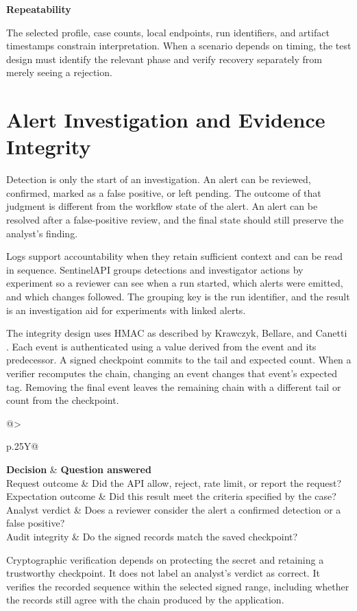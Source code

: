 \documentclass[11pt,a4paper,oneside]{report}
\makeatletter
\newcommand{\topic}[1]{\smallskip\noindent\textbf{#1}\par\nobreak\vspace{-.39em}}
\newcommand{\sheet}[1]{\clearpage\section{#1}}
\newcommand{\tabletitle}[1]{\captionof{table}{#1}\smallskip}
\newcommand{\bodytable}[1]{\begin{tabularx}{\linewidth}{@{}>{\raggedright\arraybackslash}p{.25\linewidth}Y@{}}\toprule #1\bottomrule\end{tabularx}}
\makeatother
\begin{document}
\topic{Repeatability}
The selected profile, case counts, local endpoints, run identifiers, and artifact timestamps constrain interpretation. When a scenario depends on timing, the test design must identify the relevant phase and verify recovery separately from merely seeing a rejection.

\sheet{Alert Investigation and Evidence Integrity}
Detection is only the start of an investigation. An alert can be reviewed, confirmed, marked as a false positive, or left pending. The outcome of that judgment is different from the workflow state of the alert. An alert can be resolved after a false-positive review, and the final state should still preserve the analyst's finding.

Logs support accountability when they retain sufficient context and can be read in sequence. SentinelAPI groups detections and investigator actions by experiment so a reviewer can see when a run started, which alerts were emitted, and which changes followed. The grouping key is the run identifier, and the result is an investigation aid for experiments with linked alerts.

The integrity design uses HMAC as described by Krawczyk, Bellare, and Canetti \cite{hmac}. Each event is authenticated using a value derived from the event and its predecessor. A signed checkpoint commits to the tail and expected count. When a verifier recomputes the chain, changing an event changes that event's expected tag. Removing the final event leaves the remaining chain with a different tail or count from the checkpoint.

\tabletitle{Security decisions and evidence decisions}
\bodytable{\textbf{Decision} & \textbf{Question answered}\\\midrule
Request outcome & Did the API allow, reject, rate limit, or report the request?\\
Expectation outcome & Did this result meet the criteria specified by the case?\\
Analyst verdict & Does a reviewer consider the alert a confirmed detection or a false positive?\\
Audit integrity & Do the signed records match the saved checkpoint?\\}

Cryptographic verification depends on protecting the secret and retaining a trustworthy checkpoint. It does not label an analyst's verdict as correct. It verifies the recorded sequence within the selected signed range, including whether the records still agree with the chain produced by the application.
\end{document}
